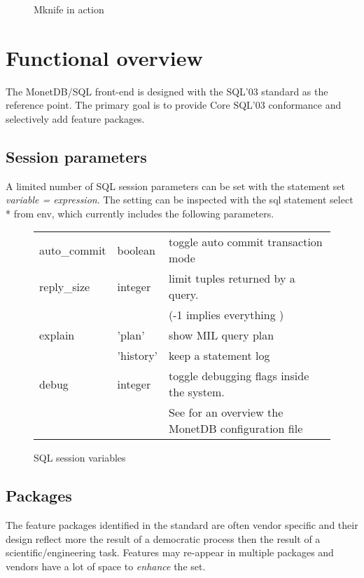 \documentclass[10pt,twocolumn,fleqn]{article}
\begin{document}
\begin{figure*}
\begin{center}
\caption{Mknife in action }
\end{center}
\end{figure*}


\section{Functional overview}
\label{Functionality}
The MonetDB/SQL front-end is designed with the SQL'03 standard as the reference
point. The primary goal is to provide Core SQL'03 conformance and
selectively add feature packages.

\subsection*{Session parameters}
A limited number of SQL session parameters can be set with the
statement {\sc set} {\em variable = expression}.
The setting can be inspected with the {\sc sql} statement
{\sc select} * {\sc from} env, which currently includes
the following parameters.
\begin{figure*}
\begin{tabular}{ll l}
auto\_commit & boolean & toggle auto commit transaction mode\\
reply\_size & integer & limit tuples returned by a query.\\
	&& (-1 implies everything )\\
explain & 'plan' & show MIL query plan\\
	& 'history' & keep a statement log \\
debug & integer & toggle debugging flags inside the system.\\
 && See for an overview the MonetDB configuration file\\
\end{tabular}
\caption{SQL session variables}
\end{figure*}

\subsection*{Packages}
The feature packages identified in the standard are often vendor specific
and their design reflect more the result of a democratic process then
the result of a scientific/engineering task.
Features may re-appear in multiple packages and vendors have a lot of
space to {\em enhance} the set.
\end{document}
